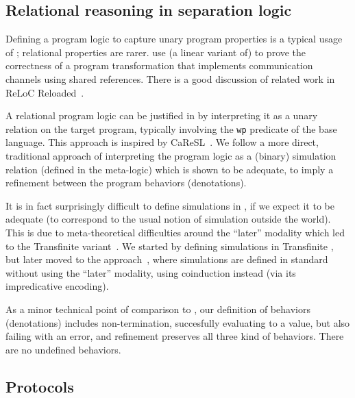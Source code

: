 \subsection{Relational reasoning in separation logic}

Defining a program logic to capture unary program properties is a typical usage of \Iris; relational properties are rarer. \citet*{tassarotti-2017} use (a linear variant of) \Iris to prove the correctness of a program transformation that implements communication channels using shared references. There is a good discussion of related work in ReLoC Reloaded~\citep*{reloc-2021}.

A relational program logic can be justified in \Iris by interpreting it as a unary relation on the target program, typically involving the \texttt{wp} predicate of the base language. This approach is inspired by CaReSL~\citet*{caresl-2013}. We follow a more direct, traditional approach of interpreting the program logic as a (binary) simulation relation (defined in the \Iris meta-logic) which is shown to be adequate, to imply a refinement between the program behaviors (denotations).

It is in fact surprisingly difficult to define simulations in \Iris, if we expect it to be adequate (to correspond to the usual notion of simulation outside the \Iris world). This is due to meta-theoretical difficulties around the ``later'' modality which led to the Transfinite \Iris variant~\citet*{transfinite-iris-2021}. We started by defining simulations in Transfinite \Iris, but later moved to the \Simuliris approach~\citep*{simuliris-2022}, where simulations are defined in standard \Iris without using the ``later'' modality, using coinduction instead (via its impredicative encoding).

As a minor technical point of comparison to \Simuliris, our definition of behaviors (denotations) includes non-termination, succesfully evaluating to a value, but also failing with an error, and refinement preserves all three kind of behaviors. There are no undefined behaviors.

\subsection{Protocols}

